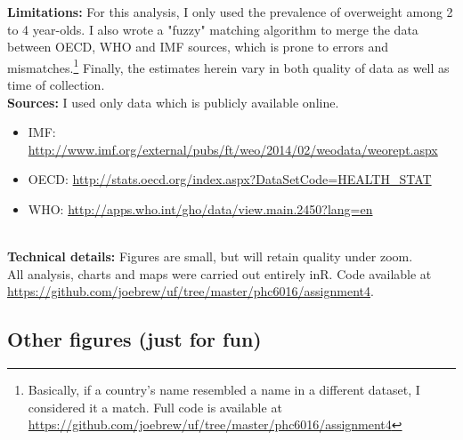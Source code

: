\documentclass[11pt]{article}
\begin{document}
\begin{multicols}{2}
\noindent \textbf{Limitations:} For this analysis, I only used the prevalence of overweight among 2 to 4 year-olds.  I also wrote a "fuzzy" matching algorithm to merge the data between OECD, WHO and IMF sources, which is prone to errors and mismatches.\footnote{Basically, if a country's name resembled a name in a different dataset, I considered it a match.   Full code is available at \url{https://github.com/joebrew/uf/tree/master/phc6016/assignment4}}  Finally, the estimates herein vary in both quality of data as well as time of collection.  \\

\noindent \textbf{Sources:} I used only data which is publicly available online.  
\begin{itemize}

\item IMF: \url{http://www.imf.org/external/pubs/ft/weo/2014/02/weodata/weorept.aspx}
\item OECD: \url{http://stats.oecd.org/index.aspx?DataSetCode=HEALTH_STAT}
\item WHO: \url{http://apps.who.int/gho/data/view.main.2450?lang=en}

\end{itemize} \\

\vspace{3mm}
\noindent \textbf{Technical details:} Figures are small, but will retain quality under zoom.  \\
All analysis, charts and maps were carried out entirely inR.  Code available at \url{https://github.com/joebrew/uf/tree/master/phc6016/assignment4}.    



\vfill
\columnbreak


\subsection*{Other figures (just for fun)}



\end{multicols}
\end{document}
